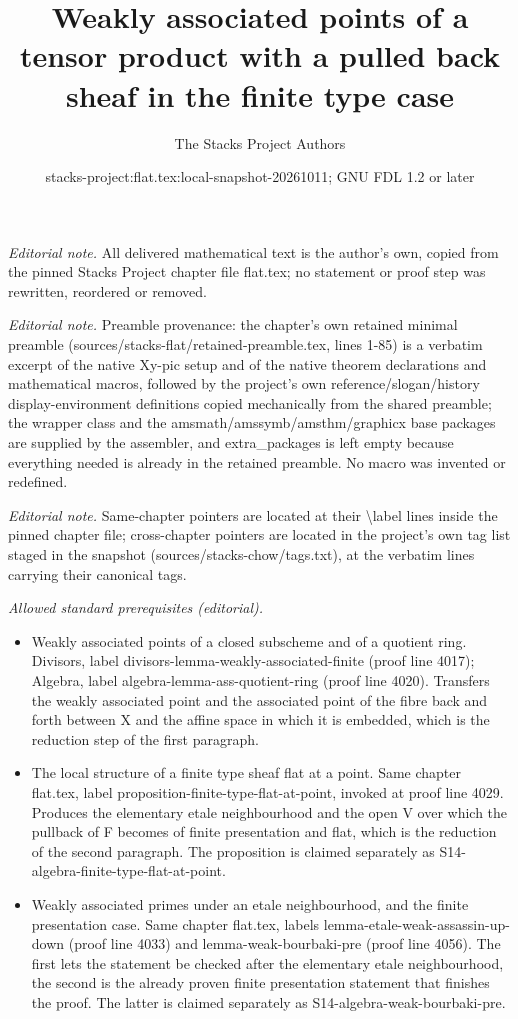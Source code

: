 \documentclass[10pt,a4paper]{amsart}
\title{Weakly associated points of a tensor product with a pulled back sheaf in the finite type case}
\author{The Stacks Project Authors}
\date{stacks-project:flat.tex:local-snapshot-20261011; GNU FDL 1.2 or later}
\theoremstyle{plain}
\theoremstyle{definition}
\theoremstyle{remark}
\numberwithin{equation}{subsection}
\begin{document}
\maketitle
\noindent\textit{Editorial note.} All delivered mathematical text is the author's own, copied from the pinned Stacks Project chapter file flat.tex; no statement or proof step was rewritten, reordered or removed.\par\medskip
\noindent\textit{Editorial note.} Preamble provenance: the chapter's own retained minimal preamble (sources/stacks-flat/retained-preamble.tex, lines 1-85) is a verbatim excerpt of the native Xy-pic setup and of the native theorem declarations and mathematical macros, followed by the project's own reference/slogan/history display-environment definitions copied mechanically from the shared preamble; the wrapper class and the amsmath/amssymb/amsthm/graphicx base packages are supplied by the assembler, and extra\_packages is left empty because everything needed is already in the retained preamble. No macro was invented or redefined.\par\medskip
\noindent\textit{Editorial note.} Same-chapter pointers are located at their \textbackslash{}label lines inside the pinned chapter file; cross-chapter pointers are located in the project's own tag list staged in the snapshot (sources/stacks-chow/tags.txt), at the verbatim lines carrying their canonical tags.\par\medskip
\noindent\textit{Allowed standard prerequisites (editorial).}\begin{itemize}
\item Weakly associated points of a closed subscheme and of a quotient ring. Divisors, label divisors-lemma-weakly-associated-finite (proof line 4017); Algebra, label algebra-lemma-ass-quotient-ring (proof line 4020). Transfers the weakly associated point and the associated point of the fibre back and forth between X and the affine space in which it is embedded, which is the reduction step of the first paragraph.
\item The local structure of a finite type sheaf flat at a point. Same chapter flat.tex, label proposition-finite-type-flat-at-point, invoked at proof line 4029. Produces the elementary etale neighbourhood and the open V over which the pullback of F becomes of finite presentation and flat, which is the reduction of the second paragraph. The proposition is claimed separately as S14-algebra-finite-type-flat-at-point.
\item Weakly associated primes under an etale neighbourhood, and the finite presentation case. Same chapter flat.tex, labels lemma-etale-weak-assassin-up-down (proof line 4033) and lemma-weak-bourbaki-pre (proof line 4056). The first lets the statement be checked after the elementary etale neighbourhood, the second is the already proven finite presentation statement that finishes the proof. The latter is claimed separately as S14-algebra-weak-bourbaki-pre.
\end{itemize}\medskip
\end{document}
